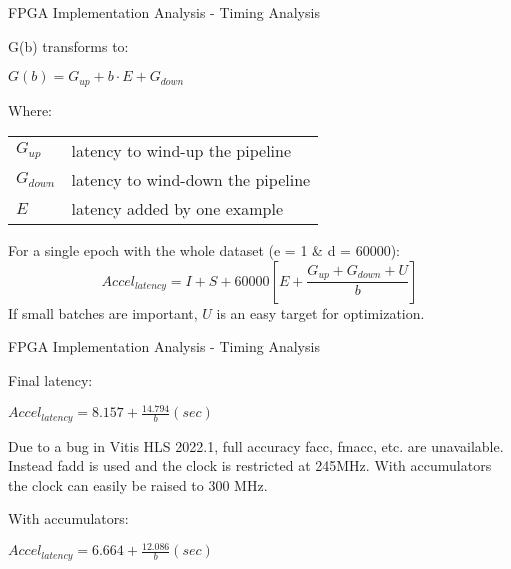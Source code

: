 \begin{frame}{FPGA Implementation Analysis - Timing Analysis}
    \begin{minipage}{0.3\textwidth}
        G(b) transforms to:
    \end{minipage}%
    \begin{minipage}{0.4\textwidth}
        \center
        $G(b) = G_{up} + b \cdot E + G_{down}$
    \end{minipage}%
    
    \begin{minipage}{0.25\textwidth}
        Where:
    \end{minipage}%
    \begin{minipage}{0.5\textwidth}
        \begin{table}[H]
            \center
            \small
            \begin{tabular}
                { l @{ $=$ } l }
                $G_{up}$ & latency to wind-up the pipeline\\
                $G_{down}$ & latency to wind-down the pipeline\\
                $E$ & latency added by one example\\
            \end{tabular}
        \end{table}
    \end{minipage}%
    
    For a single epoch with the whole dataset (e = 1 \& d = 60000):
    \begin{equation*}
        Accel_{latency} = I + S + 60000 [ E + \frac{ G_{up} + G_{down} + U }{b} ]
    \end{equation*}
    If small batches are important, $U$ is an easy target for optimization.
\end{frame}

\begin{frame}{FPGA Implementation Analysis - Timing Analysis}
    \begin{minipage}{0.3\textwidth}
        Final latency:
    \end{minipage}%
    \begin{minipage}{0.4\textwidth}
        \center
        $Accel_{latency} = 8.157 + \frac{ 14.794 }{b} (sec)$ %
    \end{minipage}%
    
    Due to a bug in Vitis HLS 2022.1, full accuracy facc, fmacc, etc. are unavailable. Instead fadd is used and the clock is restricted at 245MHz. With accumulators the clock can easily be raised to 300 MHz.
    
    \begin{minipage}{0.3\textwidth}
        With accumulators:
    \end{minipage}%
    \begin{minipage}{0.4\textwidth}
        \center
        $Accel_{latency} = 6.664 + \frac{ 12.086 }{b} (sec)$ %
    \end{minipage}%
\end{frame}

